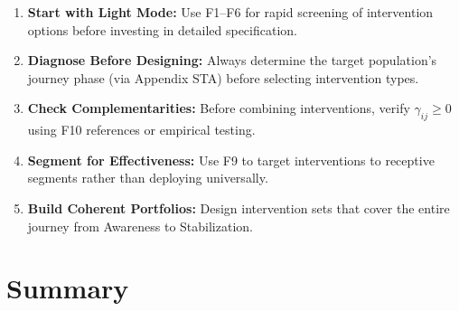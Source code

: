 \begin{tcolorbox}[colback=green!5!white, colframe=green!75!black,
    title=Practical Implications]
\begin{enumerate}
\item \textbf{Start with Light Mode:} Use F1--F6 for rapid screening of intervention options before investing in detailed specification.

\item \textbf{Diagnose Before Designing:} Always determine the target population's journey phase (via Appendix STA) before selecting intervention types.

\item \textbf{Check Complementarities:} Before combining interventions, verify $\gamma_{ij} \geq 0$ using F10 references or empirical testing.

\item \textbf{Segment for Effectiveness:} Use F9 to target interventions to receptive segments rather than deploying universally.

\item \textbf{Build Coherent Portfolios:} Design intervention sets that cover the entire journey from Awareness to Stabilization.
\end{enumerate}
\end{tcolorbox}



\section{Summary}
\label{sec:hhh-summary}

